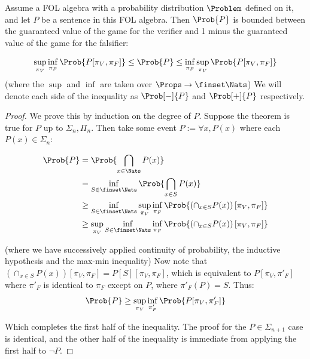 \begin{theorem}
  Assume a FOL algebra with a probability distribution $\Problem$ defined on it, and let $P$ be a sentence in this FOL algebra. Then $\Prob{P}$ is bounded between the guaranteed value of the game for the verifier and 1 minus the guaranteed value of the game for the falsifier:

  \begin{equation*}
    \sup_{\pi_V}\inf_{\pi_F}\Prob{P[\pi_V,\pi_F]} \le
    \Prob{P} \le
    \inf_{\pi_F}\sup_{\pi_V}\Prob{P[\pi_V,\pi_F]}
  \end{equation*}
  (where the $\sup$ and $\inf$ are taken over $\Props\to\finset\Nats$) We will denote each side of the inequality as $\Prob[-]{P}$ and $\Prob[+]{P}$ respectively.
  \label{nonvf:thm:supinf}
\end{theorem}
\begin{proof}
We prove this by induction on the degree of $P$. Suppose the theorem is true for $P$ up to $\Sigma_n,\Pi_n$. Then take some event $P:=\forall x, P(x)$ where each $P(x)\in\Sigma_n$:

\begin{align*}
  \Prob{P}
  &=\Prob{\bigcap_{x\in\Nats}P(x)}\\
  &=\inf_{S\in\finset\Nats}\Prob{\bigcap_{x\in S}{P(x)}}\\
  &\ge
  \inf_{S\in\finset\Nats}
    \sup_{\pi_V}\inf_{\pi_F}\Prob{
      \left(\cap_{x\in S}{P(x)}\right)[\pi_V,\pi_F]
    }\\
  &\ge \sup_{\pi_V}\inf_{S\in\finset\Nats}\inf_{\pi_F}\Prob{
    \left(\cap_{x\in S}{P(x)}\right)[\pi_V,\pi_F]
  }\\
\end{align*}

(where we have successively applied continuity of probability, the inductive hypothesis and the max-min inequality) Now note that $\left(\cap_{x\in S}{P(x)}\right)[\pi_V,\pi_F]=P[S][\pi_V,\pi_F]$, which is equivalent to $P[\pi_V,\pi'_F]$ where $\pi'_F$ is identical to $\pi_F$ except on $P$, where $\pi'_F(P)=S$. Thus:
\begin{equation*}
  \Prob{P}\ge \sup_{\pi_V}\inf_{\pi'_F}\Prob{
    P[\pi_V,\pi'_F]
  }
\end{equation*}

Which completes the first half of the inequality. The proof for the $P\in\Sigma_{n+1}$ case is identical, and the other half of the inequality is immediate from applying the first half to $\lnot P$.

\end{proof}

